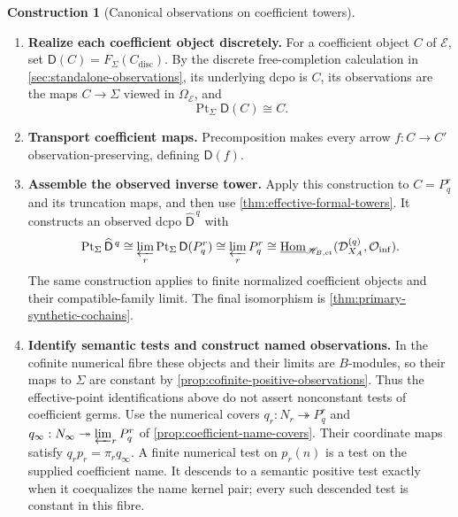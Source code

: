 \documentclass[11pt,a4paper]{article}
\numberwithin{algorithm}{section}
\numberwithin{equation}{section}
\theoremstyle{definition}
\theoremstyle{remark}
\theoremstyle{plain}
\newcommand{\E}{\mathcal E}
\newcommand{\Truth}{\Omega_{\E}}
\newcommand{\Pt}{\operatorname{Pt}_{\Sigma}}
\newcommand{\F}{F_{\Sigma}}
\newcommand{\onto}{\twoheadrightarrow}
\newcommand{\Hom}{\operatorname{Hom}}
\newcommand{\ThickEt}{\mathscr H_{B,\mathrm{et}}}
\theoremstyle{definition}
\newtheorem{construction}[construction]{Construction}
\theoremstyle{plain}
\begin{document}
\begin{construction}[Canonical observations on coefficient towers]
\label{constr:observed-coefficient-towers}\leavevmode
\begin{enumerate}[leftmargin=*,align=left]
\item \textbf{Realize each coefficient object discretely.}
For a coefficient object $C$ of $\E$, set
$\mathsf D(C)=\F(C_{\mathrm{disc}})$.
By the discrete free-completion calculation in
\cref{sec:standalone-observations}, its underlying dcpo is $C$,
its observations are the maps $C\to\Sigma$ viewed in $\Truth$, and
\[
 \Pt\mathsf D(C)\cong C.
\]
\item \textbf{Transport coefficient maps.}
Precomposition makes every arrow $f:C\to C'$ observation-preserving,
defining $\mathsf D(f)$.

\item \textbf{Assemble the observed inverse tower.}
Apply this construction to $C=P_q^r$ and its truncation maps,
and then use \cref{thm:effective-formal-towers}.  It constructs
an observed dcpo $\widehat{\mathsf D}^{\,q}$ with
\begin{equation}\label{eq:effective-primary-cochains}
 \Pt\widehat{\mathsf D}^{\,q}
 \cong\varprojlim_r\Pt\mathsf D(P_q^r)
 \cong\varprojlim_rP_q^r
 \cong\underline{\Hom}_{\ThickEt}
       (\mathcal D_{X_A}^{(q)},\mathcal O_{\mathrm{inf}}).
\end{equation}
The same construction applies to finite normalized coefficient
objects and their compatible-family limit. The final isomorphism
is \cref{thm:primary-synthetic-cochains}.

\item \textbf{Identify semantic tests and construct named observations.}
In the cofinite numerical fibre these objects and their limits
are $B$-modules, so their maps to $\Sigma$ are constant by
\cref{prop:cofinite-positive-observations}. Thus the effective-point
identifications above do not assert nonconstant tests of coefficient
germs. Use the numerical covers
$q_r:N_r\onto P_q^r$ and
$q_\infty:N_\infty\onto\varprojlim_rP_q^r$ of
\cref{prop:coefficient-name-covers}. Their coordinate maps satisfy
$q_rp_r=\pi_rq_\infty$. A finite numerical test on $p_r(n)$ is a
test on the supplied coefficient name. It descends to a semantic
positive test exactly when it coequalizes the name kernel pair;
every such descended test is constant in this fibre.
\end{enumerate}
\end{construction}
\end{document}
